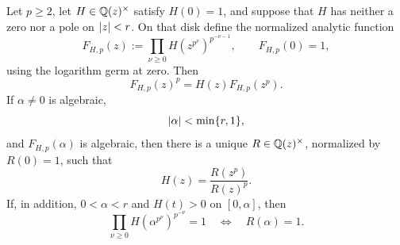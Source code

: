 \begin{theorem}
\label{thm:general-rational-p-mahler-lifting}
Let \(p\ge2\), let \(H\in\mathbb{Q}(z)^\times\) satisfy \(H(0)=1\), and suppose
that \(H\) has neither a zero nor a pole on \(\lvert z \rvert<r\).  On that disk define
the normalized analytic function
\begin{equation}\label{eq:general-critical-p-mahler-product}
 F_{H,p}(z):=\prod_{\nu\ge0}
 H(z^{p^\nu})^{p^{-\nu-1}},
 \qquad F_{H,p}(0)=1,
\end{equation}
using the logarithm germ at zero.  Then
\begin{equation}\label{eq:general-critical-p-mahler-equation}
 F_{H,p}(z)^p=H(z)F_{H,p}(z^p).
\end{equation}
If \(\alpha\ne0\) is algebraic,
\[
 \lvert \alpha \rvert<\min\{r,1\},
\]
and \(F_{H,p}(\alpha)\) is algebraic, then there is a unique
\(R\in\mathbb{Q}(z)^\times\), normalized by \(R(0)=1\), such that
\begin{equation}\label{eq:general-critical-p-mahler-lifted-certificate}
 H(z)=\frac{R(z^p)}{R(z)^p}.
\end{equation}
If, in addition, \(0<\alpha<r\) and \(H(t)>0\) on \([0,\alpha]\), then
\begin{equation}\label{eq:general-critical-p-mahler-positive-equivalence}
 \prod_{\nu\ge0}H(\alpha^{p^\nu})^{p^{-\nu}}=1
 \quad\Longleftrightarrow\quad R(\alpha)=1.
\end{equation}
\end{theorem}

